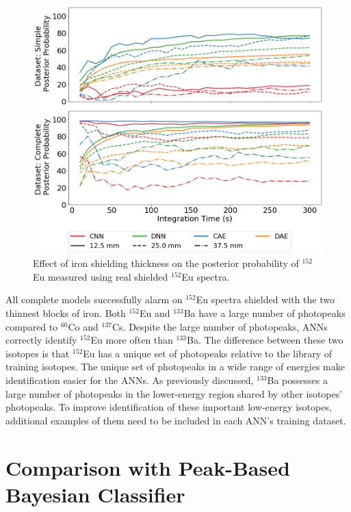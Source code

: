 \begin{figure}[H]
	\centering
	\includegraphics[width=0.8\linewidth]{images/iron_eu152}
	\caption{Effect of iron shielding thickness on the posterior probability of $^{152}$Eu measured using real shielded $^{152}$Eu spectra.}
	\label{fig:iron_eu152}
\end{figure}

All complete models successfully alarm on $^{152}$Eu spectra shielded with the two thinnest blocks of iron. Both $^{152}$Eu and $^{133}$Ba have a large number of photopeaks compared to $^{60}$Co and $^{137}$Cs. Despite the large number of photopeaks, ANNs correctly identify $^{152}$Eu more often than $^{133}$Ba. The difference between these two isotopes is that $^{152}$Eu has a unique set of photopeaks relative to the library of training isotopes. The unique set of photopeaks in a wide range of energies make identification easier for the ANNs. As previously discussed, $^{133}$Ba possesses a large number of photopeaks in the lower-energy region shared by other isotopes' photopeaks. To improve identification of these important low-energy isotopes, additional examples of them need to be included in each ANN's training dataset.

\section{Comparison with Peak-Based Bayesian Classifier}

